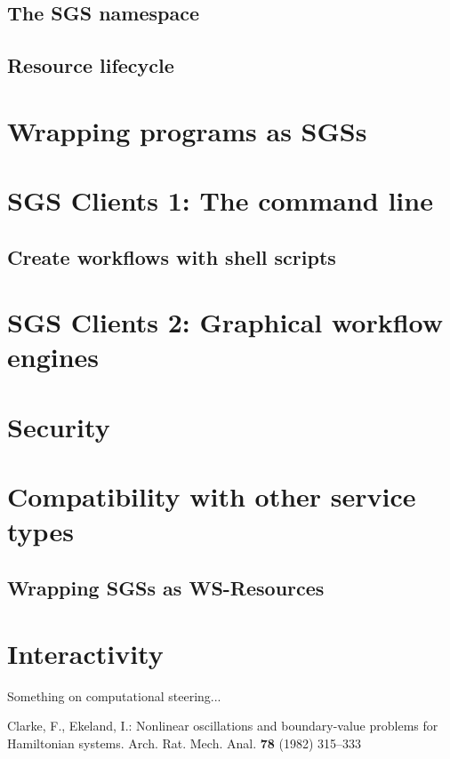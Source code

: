 \documentclass{llncs}
\begin{document}
\subsection{The SGS namespace}
\subsection{Resource lifecycle}
%
\section{Wrapping programs as SGSs}
%
\section{SGS Clients 1: The command line}
\subsection{Create workflows with shell scripts}
%
\section{SGS Clients 2: Graphical workflow engines}
%
\section{Security}
%
\section{Compatibility with other service types}
\subsection{Wrapping SGSs as WS-Resources}
%
\section{Interactivity}
Something on computational steering...
%
%
\begin{thebibliography}{refs}
%
%
Clarke, F., Ekeland, I.:
Nonlinear oscillations and
boundary-value problems for Hamiltonian systems.
Arch. Rat. Mech. Anal. {\bf 78} (1982) 315--333

\end{thebibliography}
\end{document}
